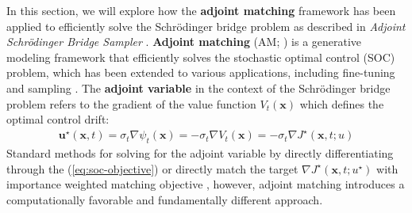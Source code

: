 \documentclass{article}
\newcommand{\boldtext}[1]{\textbf{\textcolor{MyGreen}{#1}}}
\begin{document}
In this section, we will explore how the \textbf{adjoint matching} framework \citep{domingo2024adjoint} has been applied to efficiently solve the Schrödinger bridge problem as described in \textit{Adjoint Schrödinger Bridge Sampler} \citep{liu2025adjoint}. \boldtext{Adjoint matching} (AM; \citet{domingo2024adjoint}) is a generative modeling framework that efficiently solves the stochastic optimal control (SOC) problem, which has been extended to various applications, including fine-tuning \citep{domingo2024adjoint} and sampling  \citep{havens2025adjoint, park2025functional}. The \boldtext{adjoint variable} in the context of the Schrödinger bridge problem refers to the gradient of the value function $V_t(\boldsymbol{x})$ which defines the optimal control drift: 
\begin{align}
    \boldsymbol{u}^\star(\boldsymbol{x},t)=\sigma_t\nabla \psi_t(\boldsymbol{x})=-\sigma_t\nabla V_t(\boldsymbol{x})=-\sigma_t\nabla J^\star(\boldsymbol{x},t;u)
\end{align}
Standard methods for solving for the adjoint variable by directly differentiating through the (\ref{eq:soc-objective}) \citep{han2016deep} or directly match the target $\nabla J^\star(\boldsymbol{x},t;u^\star)$ with importance weighted matching objective \citep{rubinstein2004cross, zhang2014applications, domingo2024stochastic}, however, adjoint matching introduces a computationally favorable and fundamentally different approach. 
\end{document}
